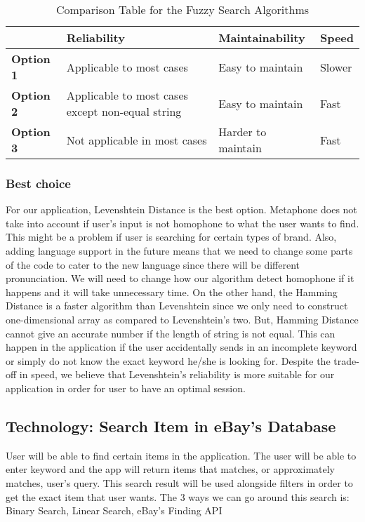 \documentclass[journal,compsoc, 10pt, draftclsnofoot, onecolumn]{IEEEtran}
\begin{document}
\begin{table}[h]
	\centering
	\caption{Comparison Table for the Fuzzy Search Algorithms}
	\label{Comparison Table for the Fuzzy Search Algorithms}
	\begin{tabularx}{\textwidth}{|l|l|l|X|}
		\hline
\textbf{} & \textbf{Reliability} & \textbf{Maintainability} & \textbf{Speed}
		\\ \hline
		\textbf{Option 1} & Applicable to most cases & Easy to maintain & Slower
		\\ \hline
\textbf{Option 2} & Applicable to most cases except non-equal string & Easy to
maintain & Fast
		\\ \hline
\textbf{Option 3} & Not applicable in most cases & Harder to maintain & Fast		\\ \hline
	\end{tabularx}
\end{table}

\subsubsection{Best choice}
For our application, Levenshtein Distance is the best option. Metaphone does not take
into account if user's input is not homophone to what the user wants to find. This
might be a problem if user is searching for certain types of brand. Also, adding
language support in the future means that we need to change some parts of the code to
cater to the new language since there will be different pronunciation. We will need
to change how our algorithm detect homophone if it happens and it will take
unnecessary time. On the other hand, the Hamming Distance is a faster algorithm than
Levenshtein since we only need to construct one-dimensional array as compared to
Levenshtein's two. But, Hamming Distance cannot give an accurate number if the length
of string is not equal. This can happen in the application if the user accidentally
sends in an incomplete keyword or simply do not know the exact keyword he/she is
looking for. Despite the trade-off in speed, we believe that Levenshtein's
reliability is more suitable for our application in order for user to have an optimal
session.

\subsection{Technology: Search Item in eBay's Database}
User will be able to find certain items in the application. The user will be able to
enter keyword and the app will return items that matches, or approximately matches,
user's query. This search result will be used alongside filters in order to get the
exact item that user wants.
The 3 ways we can go around this search is: Binary Search, Linear Search, eBay's
Finding API
\end{document}
